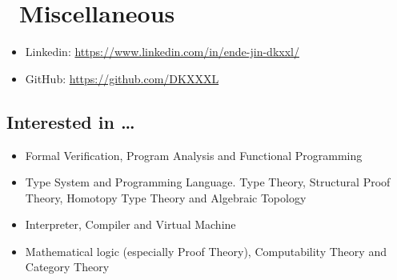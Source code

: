 \documentclass{resume}
\begin{document}

\section{\faInfo\ Miscellaneous}
\begin{itemize}[parsep=0.5ex]
  \item Linkedin: \url{https://www.linkedin.com/in/ende-jin-dkxxl/}
  \item GitHub: \url{https://github.com/DKXXXL}
\end{itemize}

\subsection{\textbf{Interested in …}}
\begin{itemize}
\item Formal Verification, Program Analysis and Functional Programming
\item Type System and Programming Language. Type Theory, Structural Proof Theory, Homotopy Type Theory and Algebraic Topology
\item Interpreter, Compiler and Virtual Machine
\item Mathematical logic (especially Proof Theory), Computability Theory and Category Theory
\end{itemize}

%
%
\end{document}
